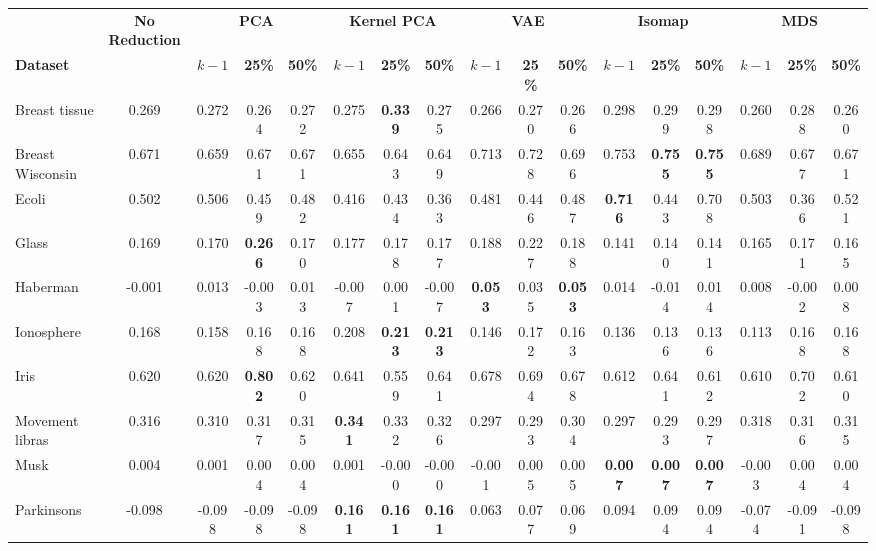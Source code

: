 \begin{tabular}{lcccccccccccccccc}
\toprule
 & \textbf{No Reduction} & \multicolumn{3}{c}{\textbf{PCA}} & \multicolumn{3}{c}{\textbf{Kernel PCA}} & \multicolumn{3}{c}{\textbf{VAE}} & \multicolumn{3}{c}{\textbf{Isomap}} & \multicolumn{3}{c}{\textbf{MDS}} \\
\cmidrule(lr){3-5} \cmidrule(lr){6-8} \cmidrule(lr){9-11} \cmidrule(lr){12-14} \cmidrule(lr){15-17}
\textbf{Dataset} &  & \textbf{$k-1$} & \textbf{25\%} & \textbf{50\%} & \textbf{$k-1$} & \textbf{25\%} & \textbf{50\%} & \textbf{$k-1$} & \textbf{25\%} & \textbf{50\%} & \textbf{$k-1$} & \textbf{25\%} & \textbf{50\%} & \textbf{$k-1$} & \textbf{25\%} & \textbf{50\%} \\
\midrule
Breast tissue & 0.269 & 0.272 & 0.264 & 0.272 & 0.275 & \textbf{0.339} & 0.275 & 0.266 & 0.270 & 0.266 & 0.298 & 0.299 & 0.298 & 0.260 & 0.288 & 0.260 \\
Breast Wisconsin & 0.671 & 0.659 & 0.671 & 0.671 & 0.655 & 0.643 & 0.649 & 0.713 & 0.728 & 0.696 & 0.753 & \textbf{0.755} & \textbf{0.755} & 0.689 & 0.677 & 0.671 \\
Ecoli & 0.502 & 0.506 & 0.459 & 0.482 & 0.416 & 0.434 & 0.363 & 0.481 & 0.446 & 0.487 & \textbf{0.716} & 0.443 & 0.708 & 0.503 & 0.366 & 0.521 \\
Glass & 0.169 & 0.170 & \textbf{0.266} & 0.170 & 0.177 & 0.178 & 0.177 & 0.188 & 0.227 & 0.188 & 0.141 & 0.140 & 0.141 & 0.165 & 0.171 & 0.165 \\
Haberman & -0.001 & 0.013 & -0.003 & 0.013 & -0.007 & 0.001 & -0.007 & \textbf{0.053} & 0.035 & \textbf{0.053} & 0.014 & -0.014 & 0.014 & 0.008 & -0.002 & 0.008 \\
Ionosphere & 0.168 & 0.158 & 0.168 & 0.168 & 0.208 & \textbf{0.213} & \textbf{0.213} & 0.146 & 0.172 & 0.163 & 0.136 & 0.136 & 0.136 & 0.113 & 0.168 & 0.168 \\
Iris & 0.620 & 0.620 & \textbf{0.802} & 0.620 & 0.641 & 0.559 & 0.641 & 0.678 & 0.694 & 0.678 & 0.612 & 0.641 & 0.612 & 0.610 & 0.702 & 0.610 \\
Movement libras & 0.316 & 0.310 & 0.317 & 0.315 & \textbf{0.341} & 0.332 & 0.326 & 0.297 & 0.293 & 0.304 & 0.297 & 0.293 & 0.297 & 0.318 & 0.316 & 0.315 \\
Musk & 0.004 & 0.001 & 0.004 & 0.004 & 0.001 & -0.000 & -0.000 & -0.001 & 0.005 & 0.005 & \textbf{0.007} & \textbf{0.007} & \textbf{0.007} & -0.003 & 0.004 & 0.004 \\
Parkinsons & -0.098 & -0.098 & -0.098 & -0.098 & \textbf{0.161} & \textbf{0.161} & \textbf{0.161} & 0.063 & 0.077 & 0.069 & 0.094 & 0.094 & 0.094 & -0.074 & -0.091 & -0.098 \\

\end{tabular}
